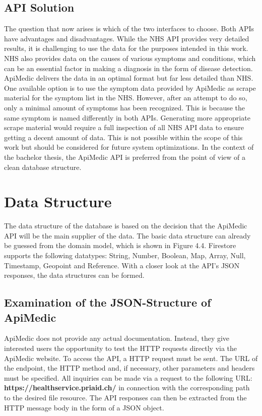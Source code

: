 \subsection{API Solution}
The question that now arises is which of the two interfaces to choose. Both APIs have advantages and disadvantages. While the NHS API provides very detailed results, it is challenging to use the data for the purposes intended in this work. NHS also provides data on the causes of various symptoms and conditions, which can be an essential factor in making a diagnosis in the form of disease detection. ApiMedic delivers the data in an optimal format but far less detailed than NHS. One available option is to use the symptom data provided by ApiMedic as scrape material for the symptom list in the NHS. However, after an attempt to do so, only a minimal amount of symptoms has been recognized. This is because the same symptom is named differently in both APIs. Generating more appropriate scrape material would require a full inspection of all NHS API data to ensure getting a decent amount of data. This is not possible within the scope of this work but should be considered for future system optimizations. In the context of the bachelor thesis, the ApiMedic API is preferred from the point of view of a clean database structure.

\section{Data Structure}
The data structure of the database is based on the decision that the ApiMedic API will be the main supplier of the data. The basic data structure can already be guessed from the domain model, which is shown in Figure 4.4. Firestore supports the following datatypes: String, Number, Boolean, Map, Array, Null, Timestamp, Geopoint and Reference. With a closer look at the API's JSON responses, the data structures can be formed.

\subsection{Examination of the JSON-Structure of ApiMedic}
ApiMedic does not provide any actual documentation. Instead, they give interested users the opportunity to test the HTTP requests directly via the ApiMedic website. To access the API, a HTTP request must be sent. The URL of the endpoint, the HTTP method and, if necessary, other parameters and headers must be specified. All inquiries can be made via a request to the following URL: \textbf{https://healthservice.priaid.ch/} in connection with the corresponding path to the desired file resource. The API responses can then be extracted from the HTTP message body in the form of a JSON object.

